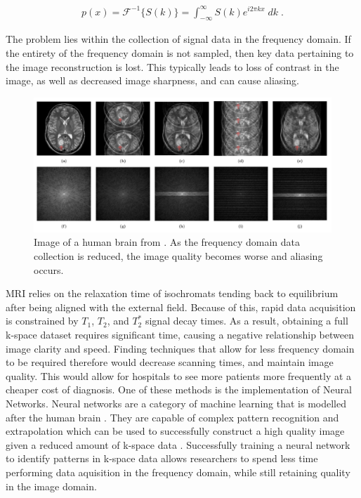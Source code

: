 \documentclass[14pt]{extreport}
\begin{document}
        \begin{align}
            p(x) = \mathcal{F}^{-1}\{ S(k) \} = \int_{-\infty}^{\infty} S(k) e^{i 2\pi k x} \;dk\;. \label{fft}
        \end{align}

        The problem lies within the collection of signal data in the frequency domain. If the entirety of the frequency domain is not sampled, then key data pertaining to the image reconstruction is lost. This typically leads to loss of contrast in the image, as well as decreased image sharpness, and can cause aliasing. 
        
        \begin{figure}[h]
            \begin{center}
                \includegraphics[width = \linewidth]{Brain Images.png}
                \caption{Image of a human brain from \cite{Hyun_Kim_Lee_Lee_Seo_2018}. As the frequency domain data collection is reduced, the image quality becomes worse and aliasing occurs.}
            \end{center}
        \end{figure}

        MRI relies on the relaxation time of isochromats tending back to equilibrium after being aligned with the external field. Because of this, rapid data acquisition is constrained by $T_1$, $T_2$, and $T_2^*$ signal decay times. As a result, obtaining a full k-space dataset requires significant time, causing a negative relationship between image clarity and speed. Finding techniques that allow for less frequency domain to be required therefore would decrease scanning times, and maintain image quality. This would allow for hospitals to see more patients more frequently at a cheaper cost of diagnosis. One of these methods is the implementation of Neural Networks. Neural networks are a category of machine learning that is modelled after the human brain \cite{Pytorch_Book}. They are capable of complex pattern recognition and extrapolation which can be used to successfully construct a high quality image given a reduced amount of k-space data \cite{Hammernik_Klatzer_Kobler_Recht_Sodickson_Pock_Knoll_2018}. Successfully training a neural network to identify patterns in k-space data allows researchers to spend less time performing data aquisition in the frequency domain, while still retaining quality in the image domain.
    
\end{document}
